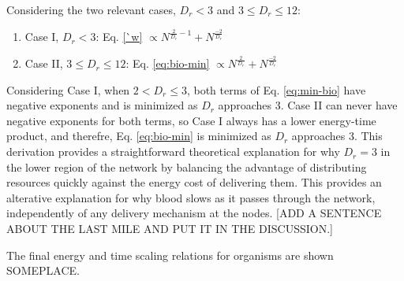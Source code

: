 \documentclass[12pt]{article}
\begin{document}


Considering the two relevant cases, $D_r < 3$ and $ 3 \leq D_r \leq 12$:
\begin{enumerate}
\item Case I,  $D_r < 3$: Eq. \ref{`w}  $\propto N^{\frac{2}{D_r}-1} +
  N^{\frac{-2}{D_r}}$
\item Case II, $ 3 \leq D_r \leq 12$: Eq. \ref{eq:bio-min} $\propto N^{\frac{2}{D_r}}
  + N^{\frac{-2}{D_r}}$
\end{enumerate}

Considering Case I, when $2 < D_r \leq 3$, both terms of
Eq. \ref{eq:min-bio} have negative exponents and is minimized as $D_r$
approaches 3.  Case II can never have negative exponents for both
terms, so Case I always has a lower energy-time product, and therefre,
Eq. \ref{eq:bio-min} is minimized as $D_r$ approaches 3.   
This derivation provides a straightforward theoretical explanation for why $D_r =
3$ in the lower region of the network by balancing the advantage of
distributing resources quickly against the energy cost of delivering
them.  This provides an alterative explanation for why blood slows
as it passes through the network, independently of any delivery
mechanism at the nodes.  [ADD A SENTENCE ABOUT THE LAST MILE AND PUT
IT IN THE DISCUSSION.]


The final energy and time scaling relations for 
organisms are shown SOMEPLACE.
\end{document}
